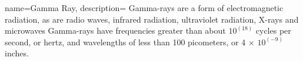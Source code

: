 {
name=Gamma Ray,
    description={ Gamma-rays are a form of electromagnetic radiation, as are radio waves, infrared radiation, ultraviolet radiation, X-rays and microwaves Gamma-rays have frequencies greater than about $10^(18)$ cycles per second, or hertz, and wavelengths of less than 100 picometers, or 4 × $10^(-9)$ inches. }
}
